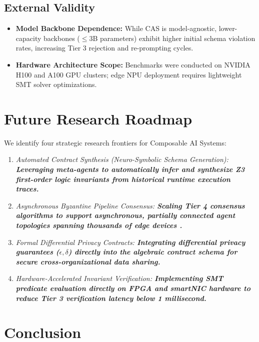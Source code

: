 \documentclass[10pt,twocolumn,letterpaper]{article}
\begin{document}
\subsection{External Validity}

\begin{itemize}
  \item \textbf{Model Backbone Dependence:} While CAS is model-agnostic, lower-capacity backbones ($\le 3$B parameters) exhibit higher initial schema violation rates, increasing Tier 3 rejection and re-prompting cycles.
  \item \textbf{Hardware Architecture Scope:} Benchmarks were conducted on NVIDIA H100 and A100 GPU clusters; edge NPU deployment requires lightweight SMT solver optimizations.
\end{itemize}




\section{Future Research Roadmap}


We identify four strategic research frontiers for Composable AI Systems:
\begin{enumerate}
  \item \textit{Automated Contract Synthesis (Neuro-Symbolic Schema Generation):\textbf{ Leveraging meta-agents to automatically infer and synthesize Z3 first-order logic invariants from historical runtime execution traces.}}
  \item \textit{Asynchronous Byzantine Pipeline Consensus:\textbf{ Scaling Tier 4 consensus algorithms to support asynchronous, partially connected agent topologies spanning thousands of edge devices \cite{crossref_10_1109_access_2026_3656309}.}}
  \item \textit{Formal Differential Privacy Contracts:\textbf{ Integrating differential privacy guarantees ($\epsilon, \delta$) directly into the algebraic contract schema for secure cross-organizational data sharing.}}
  \item \textit{Hardware-Accelerated Invariant Verification:\textbf{ Implementing SMT predicate evaluation directly on FPGA and smartNIC hardware to reduce Tier 3 verification latency below 1 millisecond.}}
\end{enumerate}




\section{Conclusion}
\end{document}
